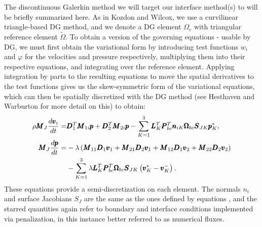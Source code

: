 The discontinuous Galerkin method we will target our interface method(s) to
will be briefly summarized here. As in Kozdon and Wilcox, we use a curvilinear
triangle-based DG method, and we denote a DG element $\Omega_e$ with triangular
reference element $\tilde{\Omega}$. To obtain a version of the governing equations
 -  usable by DG, we must first obtain the variational
form by introducing test functions $w_{i}$ and $\varphi$ for the velocities and pressure
respectively, multiplying them into their respective equations, and integrating over
the reference element. Applying integration by parts to the resulting equations to move
the spatial derivatives to the test functions gives us the skew-symmetric form of the
variational equations, which can then be spatially discretized with the DG method 
(see Hesthaven and Warburton \cite{hesthaven2007nodal} for more detail on this) to obtain:
\begin{align}
  \rho \pmb{M}_{J} \frac{d \pmb{v}_{i}}{dt} =&
  \pmb{D}_{1}^{T} \pmb{M}_{1i} \pmb{p}
  + \pmb{D}_{2}^{T} \pmb{M}_{2i} \pmb{p}
  - \sum_{K=1}^{3} \pmb{L}_{K}^{T} \pmb{P}_{bc}^{T} \pmb{n}_{iK}
  \pmb{\Omega}_{bc} \pmb{S}_{JK} \pmb{p}_{K}^{*},\\
  \notag
  \pmb{M}_{J} \frac{d\pmb{p}}{dt} =&
  -\lambda\left(
  \pmb{M}_{11} \pmb{D}_{1} \pmb{v}_{1}
    +
    \pmb{M}_{21} \pmb{D}_{2} \pmb{v}_{1}
    +
    \pmb{M}_{12} \pmb{D}_{1} \pmb{v}_{2}
    +
    \pmb{M}_{22} \pmb{D}_{2} \pmb{v}_{2}
  \right)\\
  &- \sum_{K=1}^{3}\lambda \pmb{L}_{K}^{T} \pmb{P}_{bc}^{T} \pmb{\Omega}_{bc}
  \pmb{S}_{JK} \left(\pmb{v}_{K}^* - \pmb{v}_{K}^{-}\right).
\end{align}
These equations provide a semi-discretization on each element.
The normals $n_{i}$ and surface Jacobians $S_{J}$ are the same
as the ones defined by equations , and the starred
quantities again refer to boundary and interface conditions implemented via penalization,
in this instance better referred to as numerical fluxes.
